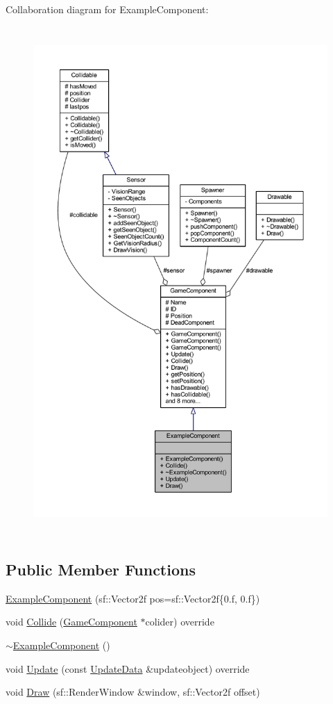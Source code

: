 Collaboration diagram for Example\-Component\-:\nopagebreak
\begin{figure}[H]
\begin{center}
\leavevmode
\includegraphics[height=550pt]{class_example_component__coll__graph}
\end{center}
\end{figure}
\subsection*{Public Member Functions}
\begin{DoxyCompactItemize}
\item 
\hyperlink{class_example_component_a09d97ad014e5ebe38220da6c80e96873}{Example\-Component} (sf\-::\-Vector2f pos=sf\-::\-Vector2f\{0.f, 0.f\})
\item 
void \hyperlink{class_example_component_a6ab733042d45aaa046201f486ece06b5}{Collide} (\hyperlink{class_game_component}{Game\-Component} $\ast$colider) override
\item 
\hyperlink{class_example_component_aa3a6265806020d1536d21272906181c6}{$\sim$\-Example\-Component} ()
\item 
void \hyperlink{class_example_component_a5891dd45e21cc525a275e10596ad3607}{Update} (const \hyperlink{class_update_data}{Update\-Data} \&updateobject) override
\item 
void \hyperlink{class_example_component_a385a5f04cdf04e91c8340632a1af9edc}{Draw} (sf\-::\-Render\-Window \&window, sf\-::\-Vector2f offset)
\end{DoxyCompactItemize}
